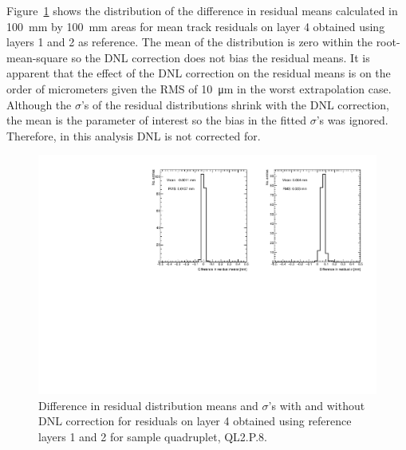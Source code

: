 Figure~\ref{fig:dnl_compare_fits} shows the distribution of the difference in residual means calculated in \SI{100}{mm} by \SI{100}{mm} areas for mean track residuals on layer 4 obtained using layers 1 and 2 as reference. The mean of the distribution is zero within the root-mean-square so the DNL correction does not bias the residual means. It is apparent that the effect of the DNL correction on the residual means is on the order of micrometers given the RMS of \SI{10}{\micro\meter} in the worst extrapolation case. Although the $\sigma$'s of the residual distributions shrink with the DNL correction, the mean is the parameter of interest so the bias in the fitted $\sigma$'s was ignored. Therefore, in this analysis DNL is not corrected for. 

\begin{figure}
    \centering
    \includegraphics[width = \textwidth]{figures/figure_compare_residual_fits_QL2P08_3100V_2021-06-18_no_dnl_minus_QL2P08_3100V_2021-06-18_2_50um_universal_DNL_layer4_fixedlayers12.pdf}
    \caption{Difference in residual distribution means and $\sigma$'s with and without DNL correction for residuals on layer 4 obtained using reference layers 1 and 2 for sample quadruplet, QL2.P.8.}
    \label{fig:dnl_compare_fits}
\end{figure}
